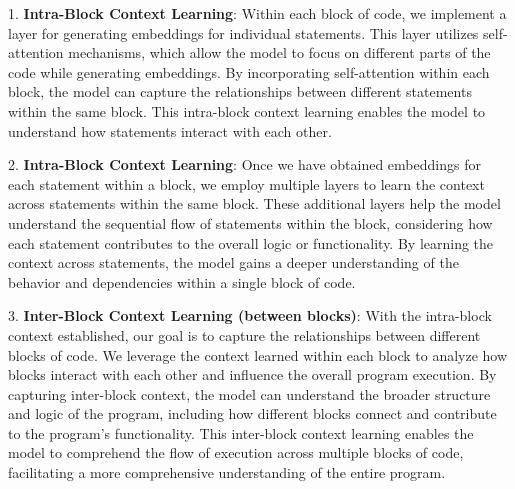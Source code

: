 1. {\bf Intra-Block Context Learning}: Within each
block of code, we implement a layer for generating embeddings for
individual statements. This layer utilizes self-attention mechanisms,
which allow the model to focus on different parts of the code while
generating embeddings. By incorporating self-attention within each
block, the model can capture the relationships between different
statements within the same block. This intra-block context learning
enables the model to understand how statements interact with each
other.

2. {\bf Intra-Block Context Learning}:
Once we have obtained embeddings for each statement within a block, we
employ multiple layers to learn the context across statements within
the same block. These additional layers help the model understand the
sequential flow of statements within the block, considering how each
statement contributes to the overall logic or functionality. By
learning the context across statements, the model gains a deeper
understanding of the behavior and dependencies within a single block
of code.

3. {\bf Inter-Block Context Learning (between blocks)}:
With the intra-block context established, our goal is to capture the relationships between different blocks of code. We leverage the context learned within each block to analyze how blocks interact with each other and influence the overall program execution. By capturing inter-block context, the model can understand the broader structure and logic of the program, including how different blocks connect and contribute to the program's functionality. This inter-block context learning enables the model to comprehend the flow of execution across multiple blocks of code, facilitating a more comprehensive understanding of the entire program.
